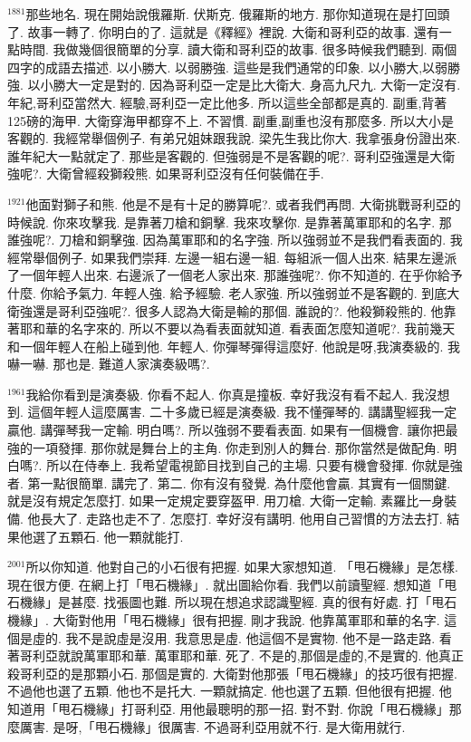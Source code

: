 \documentclass{book}
\begin{document}
$^{1881}$那些地名.
現在開始說俄羅斯.
伏斯克.
俄羅斯的地方.
那你知道現在是打回頭了.
故事一轉了.
你明白的了.
這就是《釋經》裡說.
大衛和哥利亞的故事.
還有一點時間.
我做幾個很簡單的分享.
讀大衛和哥利亞的故事.
很多時候我們聽到.
兩個四字的成語去描述.
以小勝大.
以弱勝強.
這些是我們通常的印象.
以小勝大,以弱勝強.
以小勝大一定是對的.
因為哥利亞一定是比大衛大.
身高九尺九.
大衛一定沒有.
年紀,哥利亞當然大.
經驗,哥利亞一定比他多.
所以這些全部都是真的.
副重,背著125磅的海甲.
大衛穿海甲都穿不上.
不習慣.
副重,副重也沒有那麼多.
所以大小是客觀的.
我經常舉個例子.
有弟兄姐妹跟我說.
梁先生我比你大.
我拿張身份證出來.
誰年紀大一點就定了.
那些是客觀的.
但強弱是不是客觀的呢?.
哥利亞強還是大衛強呢?.
大衛曾經殺獅殺熊.
如果哥利亞沒有任何裝備在手.

$^{1921}$他面對獅子和熊.
他是不是有十足的勝算呢?.
或者我們再問.
大衛挑戰哥利亞的時候說.
你來攻擊我.
是靠著刀槍和銅擊.
我來攻擊你.
是靠著萬軍耶和的名字.
那誰強呢?.
刀槍和銅擊強.
因為萬軍耶和的名字強.
所以強弱並不是我們看表面的.
我經常舉個例子.
如果我們崇拜.
左邊一組右邊一組.
每組派一個人出來.
結果左邊派了一個年輕人出來.
右邊派了一個老人家出來.
那誰強呢?.
你不知道的.
在乎你給予什麼.
你給予氣力.
年輕人強.
給予經驗.
老人家強.
所以強弱並不是客觀的.
到底大衛強還是哥利亞強呢?.
很多人認為大衛是輸的那個.
誰說的?.
他殺獅殺熊的.
他靠著耶和華的名字來的.
所以不要以為看表面就知道.
看表面怎麼知道呢?.
我前幾天和一個年輕人在船上碰到他.
年輕人.
你彈琴彈得這麼好.
他說是呀,我演奏級的.
我嚇一嚇.
那也是.
難道人家演奏級嗎?.

$^{1961}$我給你看到是演奏級.
你看不起人.
你真是撞板.
幸好我沒有看不起人.
我沒想到.
這個年輕人這麼厲害.
二十多歲已經是演奏級.
我不懂彈琴的.
講講聖經我一定贏他.
講彈琴我一定輸.
明白嗎?.
所以強弱不要看表面.
如果有一個機會.
讓你把最強的一項發揮.
那你就是舞台上的主角.
你走到別人的舞台.
那你當然是做配角.
明白嗎?.
所以在侍奉上.
我希望電視節目找到自己的主場.
只要有機會發揮.
你就是強者.
第一點很簡單.
講完了.
第二.
你有沒有發覺.
為什麼他會贏.
其實有一個關鍵.
就是沒有規定怎麼打.
如果一定規定要穿盔甲.
用刀槍.
大衛一定輸.
素羅比一身裝備.
他長大了.
走路也走不了.
怎麼打.
幸好沒有講明.
他用自己習慣的方法去打.
結果他選了五顆石.
他一顆就能打.

$^{2001}$所以你知道.
他對自己的小石很有把握.
如果大家想知道.
「甩石機緣」是怎樣.
現在很方便.
在網上打「甩石機緣」.
就出圖給你看.
我們以前讀聖經.
想知道「甩石機緣」是甚麼.
找張圖也難.
所以現在想追求認識聖經.
真的很有好處.
打「甩石機緣」.
大衛對他用「甩石機緣」很有把握.
剛才我說.
他靠萬軍耶和華的名字.
這個是虛的.
我不是說虛是沒用.
我意思是虛.
他這個不是實物.
他不是一路走路.
看著哥利亞就說萬軍耶和華.
萬軍耶和華.
死了.
不是的,那個是虛的,不是實的.
他真正殺哥利亞的是那顆小石.
那個是實的.
大衛對他那張「甩石機緣」的技巧很有把握.
不過他也選了五顆.
他也不是托大.
一顆就搞定.
他也選了五顆.
但他很有把握.
他知道用「甩石機緣」打哥利亞.
用他最聰明的那一招.
對不對.
你說「甩石機緣」那麼厲害.
是呀,「甩石機緣」很厲害.
不過哥利亞用就不行.
是大衛用就行.
\end{document}
